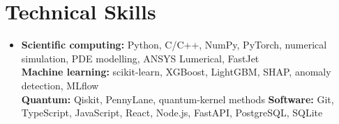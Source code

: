 \documentclass[letterpaper,10pt]{article}
\begin{document}
\section{Technical Skills}
\begin{itemize}[leftmargin=0.15in,label={},itemsep=0pt,topsep=1pt]
\small\item{\textbf{Scientific computing:} Python, C/C++, NumPy, PyTorch, numerical simulation, PDE modelling, ANSYS Lumerical, FastJet \\
\textbf{Machine learning:} scikit-learn, XGBoost, LightGBM, SHAP, anomaly detection, MLflow \\
\textbf{Quantum:} Qiskit, PennyLane, quantum-kernel methods \quad \textbf{Software:} Git, TypeScript, JavaScript, React, Node.js, FastAPI, PostgreSQL, SQLite}
\end{itemize}
\end{document}
